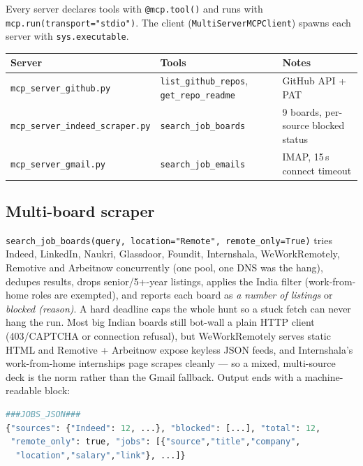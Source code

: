 \documentclass[11pt,a4paper]{article}
\newcommand{\file}[1]{\texttt{\small #1}}
\newcommand{\tool}[1]{\texttt{#1}}
\begin{document}
Every server declares tools with \tool{@mcp.tool()} and runs with
\tool{mcp.run(transport="stdio")}. The client
(\tool{MultiServerMCPClient}) spawns each server with \tool{sys.executable}.

\begin{center}
\begin{tabular}{@{}lll@{}}
\toprule
\textbf{Server} & \textbf{Tools} & \textbf{Notes}\\
\midrule
\file{mcp\_server\_github.py} & \tool{list\_github\_repos}, \tool{get\_repo\_readme} & GitHub API + PAT\\
\file{mcp\_server\_indeed\_scraper.py} & \tool{search\_job\_boards} & 9 boards, per-source blocked status\\
\file{mcp\_server\_gmail.py} & \tool{search\_job\_emails} & IMAP, 15\,s connect timeout\\
\bottomrule
\end{tabular}
\end{center}

\subsection{Multi-board scraper}
\tool{search\_job\_boards(query, location="Remote", remote\_only=True)} tries
Indeed, LinkedIn, Naukri, Glassdoor, Foundit, Internshala, WeWorkRemotely,
Remotive and Arbeitnow concurrently (one pool, one DNS was the hang), dedupes
results, drops senior/5+-year listings, applies the India filter (work-from-
home roles are exempted), and reports each board as \emph{a number of
listings} or \emph{blocked (reason)}. A hard deadline caps the whole hunt so
a stuck fetch can never hang the run. Most big Indian boards still bot-wall
a plain HTTP client (403/CAPTCHA or connection refusal), but WeWorkRemotely
serves static HTML and Remotive + Arbeitnow expose keyless JSON feeds, and
Internshala's work-from-home internships page scrapes cleanly — so a mixed,
multi-source deck is the norm rather than the Gmail fallback.
Output ends with a machine-readable block:

\begin{lstlisting}[language=Python]
###JOBS_JSON###
{"sources": {"Indeed": 12, ...}, "blocked": [...], "total": 12,
 "remote_only": true, "jobs": [{"source","title","company",
  "location","salary","link"}, ...]}
\end{lstlisting}
\end{document}
